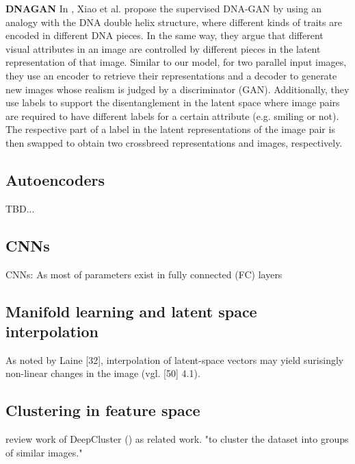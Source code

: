 \documentclass[11pt,a4paper]{article}
\begin{document}
\par \textbf{DNAGAN} In \cite{1711.05415}, Xiao et al. propose the supervised DNA-GAN by using an analogy with the DNA double helix structure, where different kinds of traits are encoded in different DNA pieces. In the same way, they argue that different visual attributes in an image are controlled by different pieces in the latent representation of that image. Similar to our model, for two parallel input images, they use an encoder to retrieve their representations and a decoder to generate new images whose realism is judged by a discriminator (GAN). Additionally, they use labels to support the disentanglement in the latent space where image pairs are required to have different labels for a certain attribute (e.g. smiling or not). The respective part of a label in the latent representations of the image pair is then swapped to obtain two crossbreed representations and images, respectively.


\subsection{Autoencoders}
TBD...

\subsection{CNNs}
\par CNNs: As most of parameters exist in fully connected (FC) layers


\subsection{Manifold learning and latent space interpolation}
As noted by Laine [32], interpolation of latent-space vectors may yield surisingly non-linear changes in the image (vgl. [50] 4.1).

\subsection{Clustering in feature space}
review work of DeepCluster (\cite{1807.05520}) as related work.
"to cluster the dataset into groups of similar images."
\end{document}

